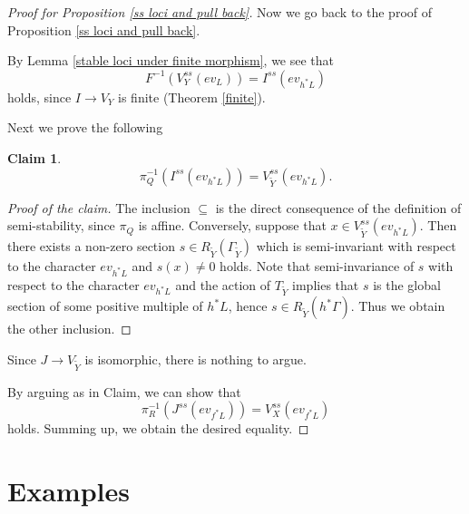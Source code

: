\documentclass[12pt,twoside]{amsart}
\newtheorem*{claim}{Claim}
\theoremstyle{definition}
\begin{document}
\begin{proof}[Proof for Proposition \ref{ss loci and pull back}]
Now we go back to the proof of Proposition \ref{ss loci and pull back}.

By Lemma \ref{stable loci under finite morphism}, we see that
\begin{equation*}
F^{-1}(V_Y^{ss}(ev_L))=I^{ss}(ev_{h^{*}L})
\end{equation*}
holds, since $I\to V_Y$ is finite (Theorem \ref{finite}).

Next we prove the following
\begin{claim}\label{essentially the same thing}
\begin{equation*}
\pi_Q^{-1}(I^{ss}(ev_{h^{*}L}))=V_{\tilde{Y}}^{ss}(ev_{h^{*}L}).
\end{equation*}
\end{claim}
\begin{proof}[Proof of the claim]
The inclusion $\subseteq$ is the direct consequence of the definition of semi-stability,
since $\pi_Q$ is affine. Conversely, suppose that $x\in V_{\tilde{Y}}^{ss}(ev_{h^{*}L})$. Then
there exists a non-zero section $s\in R_{\tilde{Y}}(\Gamma_{\tilde{Y}})$ which is
semi-invariant with respect to the character $ev_{h^{*}L}$ and $s(x)\not=0$ holds.
Note that semi-invariance of $s$ with respect to the character $ev_{h^{*}L}$ and the
action of $T_{\tilde{Y}}$ implies that $s$ is the global section of some positive multiple of
$h^{*}L$, hence $s\in R_{\tilde{Y}}(h^{*}\Gamma)$. Thus we obtain the other inclusion.
\end{proof}

Since $J\to V_{\tilde{Y}}$ is isomorphic, there is nothing to argue.

By arguing as in Claim, we can show that
\begin{equation*}
\pi_R^{-1}(J^{ss}(ev_{f^{*}L}))=V_X^{ss}(ev_{f^{*}L})
\end{equation*}
holds. Summing up, we obtain the desired equality.
\end{proof}



\section{Examples}\label{Examples}
\end{document}
